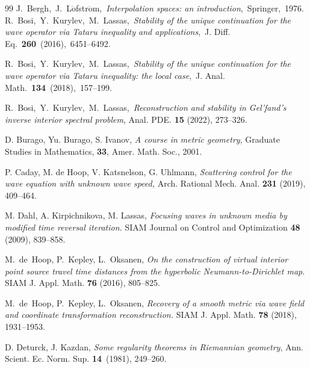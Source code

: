 \documentclass[11pt,letterpaper]{amsart}
\numberwithin{equation}{section}
\theoremstyle{definition}
\theoremstyle{plain}
\theoremstyle{definition}
\theoremstyle{plain}
\theoremstyle{definition}
\theoremstyle{plain}
\begin{document}
\begin{thebibliography}{99}
 J.~Bergh,~J.~L$\ddot{\textrm{o}}$fstr$\ddot{\textrm{o}}$m,~\emph{Interpolation spaces: an introduction},~Springer,~1976.
 R.~Bosi,~Y.~Kurylev,~M.~Lassas,~\emph{Stability of the unique continuation for the wave operator via Tataru inequality and applications},~J. Diff. Eq.~\textbf{260}~(2016),~6451--6492.

 R.~Bosi,~Y.~Kurylev,~M.~Lassas,~\emph{Stability of the unique continuation for the wave operator via Tataru inequality: the local case},~J. Anal. Math.~\textbf{134}~(2018),~157--199.

 R.~Bosi,~Y.~Kurylev,~M.~Lassas,~\emph{Reconstruction and stability in Gel'fand's inverse interior spectral problem}, Anal. PDE. \textbf{15} (2022), 273--326.

 D. Burago, Yu. Burago, S. Ivanov, \emph{A course in metric geometry}, Graduate Studies in Mathematics, \textbf{33}, Amer. Math. Soc., 2001.

P. Caday, M. de Hoop, V. Katsnelson,  G. Uhlmann, \emph{Scattering control for the wave equation with unknown wave speed,}  Arch. Rational Mech. Anal. {\bf 231}  (2019), 409--464. 



M. Dahl, A. Kirpichnikova, M. Lassas, \emph{Focusing waves in unknown media by modified time reversal iteration.}
SIAM Journal on Control and Optimization {\bf 48} (2009),  839--858.

M.~de~Hoop, P.~Kepley,  L.~Oksanen, \emph{On the construction of virtual interior point source travel time distances from the hyperbolic Neumann-to-Dirichlet map}. {SIAM J. Appl. Math.} {\bf 76} (2016), 805--825.

M.~de~Hoop, P.~Kepley,  L.~Oksanen, \emph{Recovery of a smooth metric via wave field and coordinate transformation reconstruction.} SIAM J. Appl. Math. {\bf 78} (2018), 1931--1953.

 D. Deturck, J. Kazdan, \emph{Some regularity theorems in Riemannian geometry}, Ann. Scient. Ec. Norm. Sup. \textbf{14}~(1981), 249--260.


\end{thebibliography}
\end{document}
